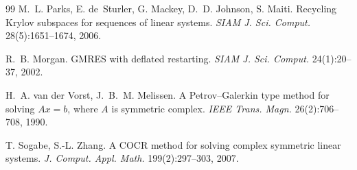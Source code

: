 \documentclass[11pt,a4paper]{article}
\begin{document}
\begin{thebibliography}{99}
 M.~L. Parks, E. de~Sturler, G. Mackey, D.~D. Johnson, S. Maiti.
Recycling Krylov subspaces for sequences of linear systems. \emph{SIAM J. Sci. Comput.}
28(5):1651--1674, 2006.

 R.~B. Morgan. GMRES with deflated restarting. \emph{SIAM J. Sci.
Comput.} 24(1):20--37, 2002.

 H.~A. van der Vorst, J.~B.~M. Melissen. A Petrov--Galerkin type method
for solving $Ax=b$, where $A$ is symmetric complex. \emph{IEEE Trans. Magn.}
26(2):706--708, 1990.

 T. Sogabe, S.-L. Zhang. A COCR method for solving complex symmetric
linear systems. \emph{J. Comput. Appl. Math.} 199(2):297--303, 2007.

\end{thebibliography}
\endgroup
\end{document}
